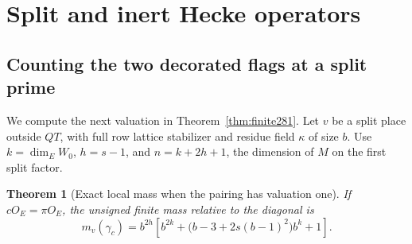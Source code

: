 \documentclass[a4paper,11pt]{article}
\newtheorem{theorem}[proposition]{Theorem}
\theoremstyle{definition}
\theoremstyle{remark}
\numberwithin{equation}{section}
\begin{document}
\section{Split and inert Hecke operators}\label{nav:g-IX-3}

\subsection{Counting the two decorated flags at a split prime}\label{nav:VIII-48}
We compute the next valuation in Theorem~\ref{thm:finite281}.
Let \(v\) be a split place outside \(QT\), with full row
lattice stabilizer and residue field \(\kappa\) of size \(b\).
Use \(k=\dim_E W_0\), \(h=s-1\), and \(n=k+2h+1\), the
dimension of \(M\) on the first split factor.

\begin{theorem}[Exact local mass when the pairing has valuation one]\leavevmode
\label{thm:split281}
If \(cO_E=\pi O_E\), the unsigned finite mass relative to the
diagonal is
\[
 m_v(\gamma_c)=b^{2h}
   \left[b^{2k}+\bigl(b-3+2s(b-1)^2\bigr)b^k+1\right].
\]
\end{theorem}
\end{document}
